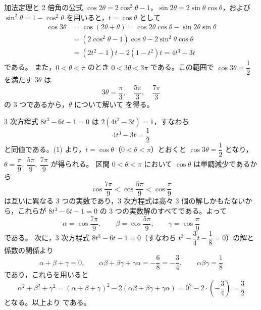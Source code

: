 
加法定理と 2 倍角の公式 $\cos 2\theta=2\cos^{2}\theta-1$，$\sin 2\theta=2\sin\theta\cos\theta$，および $\sin^{2}\theta=1-\cos^{2}\theta$ を用いると，$t=\cos\theta$ として
\begin{align*}
  \cos 3\theta &= \cos(2\theta+\theta)=\cos 2\theta\cos\theta-\sin 2\theta\sin\theta \\
  &= (2\cos^{2}\theta-1)\cos\theta-2\sin^{2}\theta\cos\theta \\
  &= (2t^{2}-1)t-2(1-t^{2})t = 4t^{3}-3t
\end{align*}
である。
また，$0<\theta<\pi$ のとき $0<3\theta<3\pi$ である。この範囲で $\cos 3\theta=\dfrac{1}{2}$ を満たす $3\theta$ は
\[
  3\theta=\frac{\pi}{3},\quad \frac{5\pi}{3},\quad \frac{7\pi}{3}
\]
の $3$ つであるから，$\theta$ について解いて
を得る。

$3$ 次方程式 $8t^{3}-6t-1=0$ は $2(4t^{3}-3t)=1$，すなわち
\[
  4t^{3}-3t=\frac{1}{2}
\]
と同値である。(1) より，$t=\cos\theta$（$0<\theta<\pi$）とおくと $\cos 3\theta=\dfrac{1}{2}$ となり，$\theta=\dfrac{\pi}{9},\ \dfrac{5\pi}{9},\ \dfrac{7\pi}{9}$ が得られる。
区間 $0<\theta<\pi$ において $\cos\theta$ は単調減少であるから
\[
  \cos\frac{7\pi}{9} < \cos\frac{5\pi}{9} < \cos\frac{\pi}{9}
\]
は互いに異なる $3$ つの実数であり，$3$ 次方程式は高々 $3$ 個の解しかもたないから，これらが $8t^{3}-6t-1=0$ の $3$ つの実数解のすべてである。よって
\[
  \alpha=\cos\frac{7\pi}{9},\qquad \beta=\cos\frac{5\pi}{9},\qquad \gamma=\cos\frac{\pi}{9}
\]
である。
次に，$3$ 次方程式 $8t^{3}-6t-1=0$（すなわち $t^{3}-\dfrac{3}{4}t-\dfrac{1}{8}=0$）の解と係数の関係より
\[
  \alpha+\beta+\gamma=0,\qquad
  \alpha\beta+\beta\gamma+\gamma\alpha=-\frac{6}{8}=-\frac{3}{4},\qquad
  \alpha\beta\gamma=\frac{1}{8}
\]
であり，これらを用いると
\[
  \alpha^{2}+\beta^{2}+\gamma^{2}=(\alpha+\beta+\gamma)^{2}-2(\alpha\beta+\beta\gamma+\gamma\alpha)=0^{2}-2\cdot\left(-\frac{3}{4}\right)=\frac{3}{2}
\]
となる。以上より
である。

